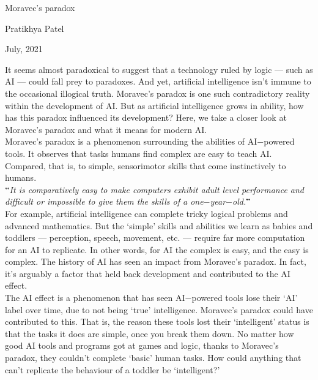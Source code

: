 \documentclass[12pt]{article}
\begin{document}
\begin{center}
{\LARGE Moravec's paradox}
\end{center}


\begin{center}
{\large Pratikhya Patel}
\end{center}


\begin{center}
{\large July, 2021}
\end{center}


\vspace{1\baselineskip}
It seems almost paradoxical to suggest that a technology ruled by logic — such as AI — could fall prey to paradoxes. And yet, artificial intelligence isn’t immune to the occasional illogical truth. Moravec’s paradox is one such contradictory reality within the development of AI. But as artificial intelligence grows in ability, how has this paradox influenced its development? Here, we take a closer look at Moravec’s paradox and what it means for modern AI.
\\

Moravec’s paradox is a phenomenon surrounding the abilities of AI$-$powered tools. It observes that tasks humans find complex are easy to teach AI. Compared, that is, to simple, sensorimotor skills that come instinctively to humans.
\\

\textit{$``$It is comparatively easy to make computers exhibit adult level performance and difficult or impossible to give them the skills of a one$-$year$-$old.$"$}
\\

For example, artificial intelligence can complete tricky logical problems and advanced mathematics. But the ‘simple’ skills and abilities we learn as babies and toddlers — perception, speech, movement, etc. — require far more computation for an AI to replicate. In other words, for AI the complex is easy, and the easy is complex. The history of AI has seen an impact from Moravec’s paradox. In fact, it’s arguably a factor that held back development and contributed to the AI effect.
\\

The AI effect is a phenomenon that has seen AI$-$powered tools lose their ‘AI’ label over time, due to not being ‘true’ intelligence. Moravec’s paradox could have contributed to this. That is, the reason these tools lost their ‘intelligent’ status is that the tasks it does are simple, once you break them down.  No matter how good AI tools and programs got at games and logic, thanks to Moravec’s paradox, they couldn’t complete ‘basic’ human tasks. How could anything that can’t replicate the behaviour of a toddler be ‘intelligent?’
\\
\end{document}
